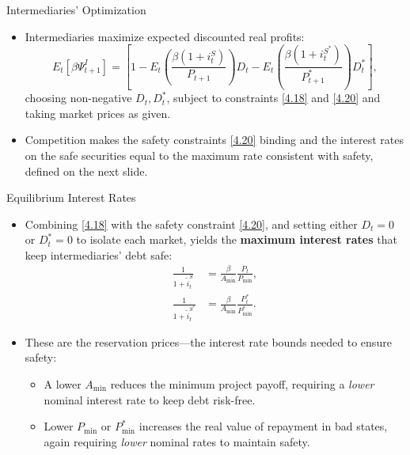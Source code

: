 \documentclass[11pt,aspectratio=169]{beamer}
\begin{document}
\begin{frame}{Intermediaries’ Optimization}
\begin{itemize} 
\item Intermediaries maximize expected discounted real profits: $$E_t[\beta \Psi_{t+1}^I]
      = \left[1 - E_t\left(\frac{\beta(1+i_t^{S})}{P_{t+1}}\right)D_t
      - E_t\left(\frac{\beta(1+i_t^{S^*})}{P_{t+1}^{*}}\right)D_t^{*}\right],$$ choosing non-negative $D_t, D_t^*$,  subject to constraints \eqref{4.18} and \eqref{4.20} and taking market prices as given. \\
\vspace{1em}
\item Competition makes the safety constraints \eqref{4.20} binding and the interest rates on the safe securities equal to the maximum rate consistent with safety, defined on the next slide.
\end{itemize}
\end{frame}

\begin{frame}{Equilibrium Interest Rates}
\small
\begin{itemize}
\item Combining \eqref{4.18} with the safety constraint \eqref{4.20}, and setting either $D_t = 0$ or $D_t^\ast = 0$ to isolate each market, yields the \textbf{maximum interest rates} that keep intermediaries’ debt safe:
\begin{align}
\frac{1}{1+\tilde{i}_t^{S}}
&= \frac{\beta}{A_{\min}} \frac{P_t}{P_{\min}}, 
\label{4.21} \\[-0.3em]
\frac{1}{1+\tilde{i}_t^{S^\ast}}
&= \frac{\beta}{A_{\min}} \frac{P_t^\ast}{P_{\min}^\ast}.
\label{4.22}
\end{align}
\item These are the reservation prices—the interest rate bounds needed to ensure safety:
\begin{itemize}
    \item A lower $A_{\min}$ reduces the minimum project payoff, requiring a \emph{lower} nominal interest rate to keep debt risk-free.
    \item Lower $P_{\min}$ or $P_{\min}^\ast$ increases the real value of repayment in bad states, again requiring \emph{lower} nominal rates to maintain safety.
\end{itemize}
\end{itemize}
\end{frame}
\end{document}
